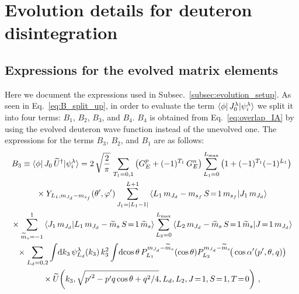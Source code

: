 \cleardoublepage
\chapter{Evolution details for deuteron disintegration}
\label{Appendix:evolution_details}

  \section{Expressions for the evolved matrix elements}
  \label{Appendix:sec:evolution_expressions}

  Here we document the expressions used in Subsec.~\ref{subsec:evolution_setup}.
  As seen in Eq.~\eqref{eq:B_split_up}, in order to evaluate the term $\langle \phi|
  \, J_0^\lambda | \psi_i^\lambda \rangle$ we split it into four terms: $B_1$,
  $B_2$, $B_3$, and $B_4$.  $B_4$ is obtained from Eq.~\eqref{eq:overlap_IA} by
  using the evolved deuteron wave function instead of the unevolved one.  The
  expressions for the terms $B_3$, $B_2$, and $B_1$ are as follows:
  \begin{multline}
   B_3 \equiv \la \phi | \, J_0 \, \widetilde{U}^\dag | \psi_i^\lambda \ra
   = 2 \, \sqrt{\frac{2}{\pi}} \,
   \sum_{T_1 = 0,1} \big(G_E ^p + (-1)^{T_1} \, G_E^n\big)
   \sum_{L_1 = 0}^{L_{\rm max}} \big(1 + (-1)^{T_1} (-1)^{L_1}\big) \\
   \null \times Y_{L_1 , \mJd - \msf} (\thetacm, \phicm)
   \sum_{J_1 = |L_1 - 1|}^{L+1}
   \CG{L_1}{\mJd - \msf}{S\!=\!1}{\msf}{J_1}{\mJd} \\
   \null \times \sum_{\widetilde{m}_s = -1}^1
   \braket{J_1 \, \mJd}{L_1 \, \mJd - \wt{m}_s \, S\!=\!1 \, \wt{m}_s}
   \sum_{L_2 = 0}^{L_{\rm max}}
   \CG{L_2}{\mJd-\widetilde{m}_s}{S\!=\!1}{\widetilde{m}_s}{J\!=\!1}{\mJd} \\
   \null \times \sum_{L_d = 0, 2}
   \int \! \dd k_3 \, \psi_{L_d}^\lambda(k_3) \, k_3^2 \int \! \dcostheta \,
    P_{L_1}^{\mJd-\widetilde{m}_s}(\cos \theta)
    P_{L_2}^{\mJd-\widetilde{m}_s}\!\big(\cos\thetacprime(\pp, \theta, q)\big)
    \\ \null \times
    \widetilde{U}\!\left(
     k_3, \sqrt{{\pp}^2 - \pp q \cos\theta + q^2/4}, L_d, L_2, J\!=\!1, S\!=\!1,
     T\!=\!0 \right) \,,
  \end{multline}
